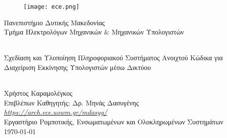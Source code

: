 \begin{titlepage}
	\begin{center}
		\begin{figure}[h]
			\centering \texttt{[image: ece.png]}
		\end{figure}
		{\LARGE Πανεπιστήμιο Δυτικής Μακεδονίας\\}
		{\Large Τμήμα Ηλεκτρολόγων Μηχανικών \& Μηχανικών Υπολογιστών}
		
		\begin{center}
			\vspace{2cm}
			
			\HRule \\[0.4cm]
			{\huge Σχεδίαση και Υλοποίηση Πληροφοριακού Συστήματος Ανοιχτού Κώδικα για Διαχείριση Εκκίνησης Υπολογιστών μέσω Δικτύου\\}
			\HRule \\[0.4cm]
		\end{center}
		
		\vfill
		\begin{doublespacing}
			
			{\LARGE Χρήστος Καραμολέγκος\\}
			{\Large Επιβλέπων Καθηγητής: Δρ. Μηνάς Δασυγένης\\}
			{\Large \href{https://arch.ece.uowm.gr/mdasyg/}{\textit{https://arch.ece.uowm.gr/mdasyg/}}\\}
			{\Large Εργαστήριο Ρομποτικής, Ενσωματωμένων και Ολοκληρωμένων Συστημάτων\\}
			\vfill 
			{\Large \today}
		\end{doublespacing}
	\end{center}
\end{titlepage}

\blankpage


